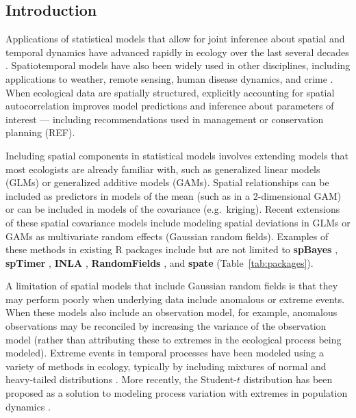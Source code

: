\documentclass[12pt,english]{article}
\begin{document}
\begin{spacing}{1.3}
\section{Introduction}


Applications of statistical models that allow for joint inference about spatial
and temporal dynamics have advanced rapidly in ecology over the last several
decades \citep[e.g.][]{bascompte1995, latimer2009}. Spatiotemporal models have
also been widely used in other disciplines, including applications to weather,
remote sensing, human disease dynamics, and crime \citep{cressie2011}. When
ecological data are spatially structured, explicitly accounting for spatial
autocorrelation improves model predictions and inference about parameters of
interest --- including recommendations used in management or conservation
planning (REF).

Including spatial components in statistical models involves extending models
that most ecologists are already familiar with, such as generalized linear
models (GLMs) or generalized additive models (GAMs). Spatial relationships can
be included as predictors in models of the mean (such as in a 2-dimensional
GAM) or can be included in models of the covariance (e.g.\ kriging). Recent
extensions of these spatial covariance models include modeling spatial
deviations in GLMs or GAMs as multivariate random effects (Gaussian random
fields). Examples of these methods in existing R packages include but are not
limited to \textbf{spBayes} \citep{finley2007}, \textbf{spTimer}
\citep{bakar2015}, \textbf{INLA} \citep{rue2009}, \textbf{RandomFields}
\citep{schlather2016}, and \textbf{spate} \citep{sigrist2015}
(Table~\ref{tab:packages}).

A limitation of spatial models that include Gaussian random fields is that they
may perform poorly when underlying data include anomalous or extreme events.
When these models also include an observation model, for example, anomalous
observations may be reconciled by increasing the variance of the observation
model (rather than attributing these to extremes in the ecological process
being modeled). Extreme events in temporal processes have been modeled using a
variety of methods in ecology, typically by including mixtures of normal and
heavy-tailed distributions \citep[e.g.][]{everitt1996, ward2007, thorson2011}.
More recently, the Student-$t$ distribution has been proposed as a
solution to modeling process variation with extremes in population dynamics
\citep{anderson2017}.


\end{spacing}
\end{document}
